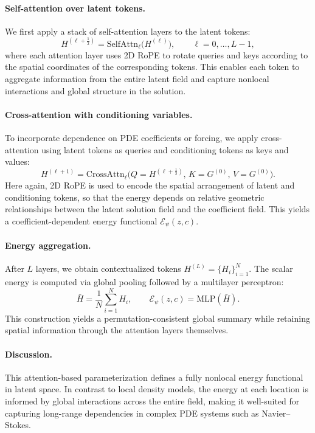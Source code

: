 \documentclass[11pt]{article}
\begin{document}
\paragraph{Self-attention over latent tokens.}
We first apply a stack of self-attention layers to the latent tokens:
\[
H^{(\ell+\frac12)} = \mathrm{SelfAttn}_\ell\big(H^{(\ell)}\big), \qquad \ell = 0,\dots,L-1,
\]
where each attention layer uses 2D RoPE to rotate queries and keys according to the spatial coordinates of the corresponding tokens. This enables each token to aggregate information from the entire latent field and capture nonlocal interactions and global structure in the solution.

\paragraph{Cross-attention with conditioning variables.}
To incorporate dependence on PDE coefficients or forcing, we apply cross-attention using latent tokens as queries and conditioning tokens as keys and values:
\[
H^{(\ell+1)} = \mathrm{CrossAttn}_\ell\big(Q=H^{(\ell+\frac12)},\, K=G^{(0)},\, V=G^{(0)}\big).
\]
Here again, 2D RoPE is used to encode the spatial arrangement of latent and conditioning tokens, so that the energy depends on relative geometric relationships between the latent solution field and the coefficient field. This yields a coefficient-dependent energy functional $\mathcal E_\psi(z,c)$.

\paragraph{Energy aggregation.}
After $L$ layers, we obtain contextualized tokens $H^{(L)} = \{H_i\}_{i=1}^N$. The scalar energy is computed via global pooling followed by a multilayer perceptron:
\[
\bar{H} = \frac{1}{N} \sum_{i=1}^N H_i,
\qquad
\mathcal E_\psi(z,c) = \mathrm{MLP}(\bar{H}).
\]
This construction yields a permutation-consistent global summary while retaining spatial information through the attention layers themselves.

\paragraph{Discussion.}
This attention-based parameterization defines a fully nonlocal energy functional in latent space. In contrast to local density models, the energy at each location is informed by global interactions across the entire field, making it well-suited for capturing long-range dependencies in complex PDE systems such as Navier--Stokes.
\end{document}
